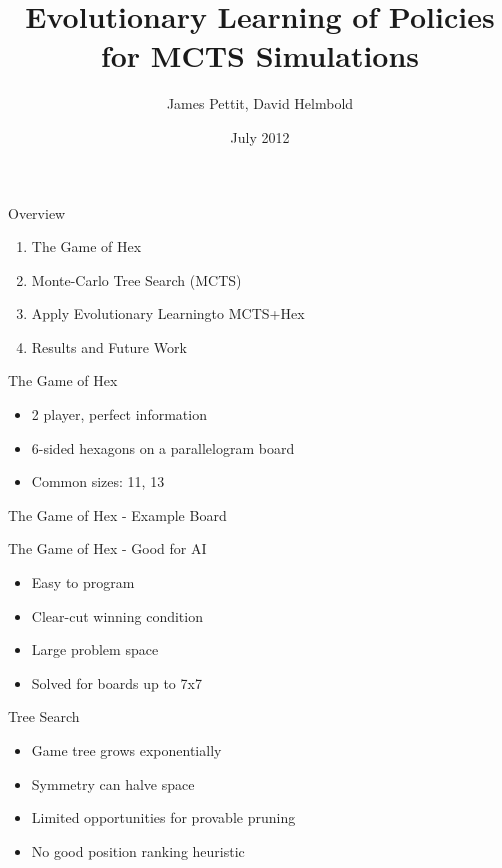 \documentclass{beamer}
\title[Learning MCTS]{Evolutionary Learning of Policies for MCTS Simulations}
\author[Pettit, Helmbold]{James Pettit, David Helmbold}
\institute[UCSC]{
  University of California, Santa Cruz\\
  \texttt{jpettit@soe.ucsc.edu}
}
\date[July 2012]{July 2012}
\begin{document}
\begin{frame}[plain]
  \titlepage
\end{frame}

\begin{frame}{Overview}
\begin{enumerate}
	\item The Game of Hex
	\item Monte-Carlo Tree Search (MCTS)
	\item Apply Evolutionary Learningto MCTS+Hex
	\item Results and Future Work
\end{enumerate}
\end{frame}

\begin{frame}{The Game of Hex}
\begin{itemize}
	\item 2 player, perfect information
	\item 6-sided hexagons on a parallelogram board
	\item Common sizes: 11, 13
\end{itemize}
\end{frame}

\begin{frame}{The Game of Hex - Example Board}
	\begin{figure}[tb]
	\end{figure}
\end{frame}

\begin{frame}{The Game of Hex - Good for AI}
\begin{itemize}
	\item Easy to program
	\item Clear-cut winning condition
	\item Large problem space
	\item Solved for boards up to 7x7
\end{itemize}
\end{frame}

\begin{frame}{Tree Search}
\begin{itemize}
	\item Game tree grows exponentially
	\item Symmetry can halve space
	\item Limited opportunities for provable pruning
	\item No good position ranking heuristic
\end{itemize}
\end{frame}
\end{document}
